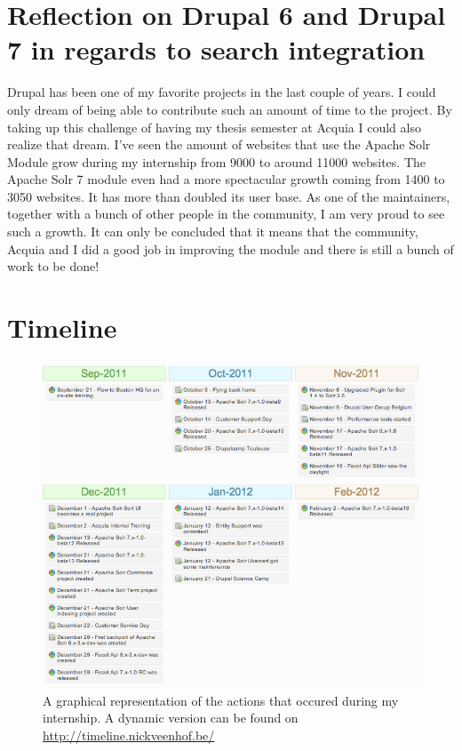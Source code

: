 \section{Reflection on Drupal 6 and Drupal 7 in regards to search integration}
Drupal has been one of my favorite projects in the last couple of years. I could only dream of being able to contribute such an amount of time to the project. By taking up this challenge of having my thesis semester at Acquia I could also realize that dream. I've seen the amount of websites that use the Apache Solr Module grow during my internship from 9000 to around 11000 websites. The Apache Solr 7 module even had a more spectacular growth coming from 1400 to 3050 websites. It has more than doubled its user base. As one of the maintainers, together with a bunch of other people in the community, I am very proud to see such a growth.
It can only be concluded that it means that the community, Acquia and I did a good job in improving the module and there is still a bunch of work to be done!

\section{Timeline}
\begin{figure}[H]
     \includegraphics[width=\textwidth]{images/event_timeline.png}
     \caption{A graphical representation of the actions that occured during my internship. A dynamic version can be found on \url{http://timeline.nickveenhof.be/}}
\end{figure}


